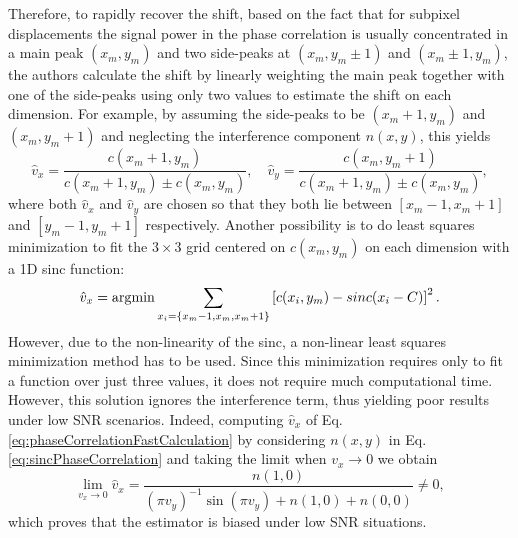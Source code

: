 Therefore, to rapidly recover the shift, based on the fact that for subpixel displacements the signal power in the phase correlation is usually concentrated in a main peak $(x_m, y_m)$ and two side-peaks at $(x_m, y_m \pm 1)$ and $(x_m \pm 1, y_m)$, the authors calculate the shift by linearly weighting the main peak together with one of the side-peaks using only two values to estimate the shift on each dimension. For example, by assuming the side-peaks to be $(x_m+1, y_m)$ and $(x_m, y_m+1)$ and neglecting the interference component $n(x,y)$, this yields
\begin{equation}
	\hat{v}_x = \frac{c(x_m+1,y_m)}{c(x_m+1,y_m) \pm c(x_m,y_m)}, \quad \hat{v}_y = \frac{c(x_m,y_m+1)}{c(x_m+1,y_m) \pm c(x_m,y_m)},
	\label{eq:phaseCorrelationFastCalculation}
\end{equation}
where both $\hat{v}_x$ and $\hat{v}_y$ are chosen so that they both lie between $[x_m-1, x_m+1]$ and $[y_m-1, y_m+1]$ respectively.
Another possibility is to do least squares minimization to fit the $3 \times 3$ grid centered on $c(x_m,y_m)$ on each dimension with a 1D sinc function:
\begin{equation}
\hat{v}_x = \operatorname*{\arg\!\min} \sum_{x_i=\{x_m -1,x_m,x_m+1\}} \left[c(x_i,y_m) - sinc(x_i-C)\right]^2.
\end{equation}
However, due to the non-linearity of the sinc, a non-linear least squares minimization method has to be used. 
Since this minimization requires only to fit a function over just three values, it does not require much computational time. However, this solution ignores the interference term, thus yielding poor results under low SNR scenarios. Indeed, computing $\hat{v}_x$ of Eq. \eqref{eq:phaseCorrelationFastCalculation} by considering $n(x,y)$ in Eq. \eqref{eq:sincPhaseCorrelation} and taking the limit when $v_x\!\rightarrow\!0$ we obtain
\begin{equation}
	\lim_{v_x \rightarrow 0} \hat{v}_x = \frac{n(1,0)}{(\pi v_y)^{-1}\sin(\pi v_y) + n(1,0) + n(0,0)} \neq 0,
	\label{eq:biasFoorosh}
\end{equation}
which proves that the estimator is biased under low SNR situations.

